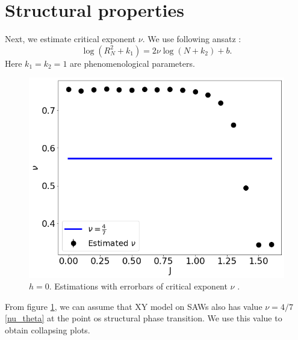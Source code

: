 \section{Structural properties}
Next, we estimate critical exponent $\nu$. We use following ansatz  \cite{Berretti1985}:
\begin{equation}
\label{berettiscale}
\log (R_N^2+k_1 ) = 2 \nu \log (N+k_2) + b.
\end{equation}
Here $k_1=k_2=1$ are phenomenological parameters. 
 \begin{figure}[H]
	\centering
	\includegraphics[scale=0.36]{Images/nu_shortchains.png}
	\caption{$h=0$. Estimations with errorbars of critical exponent $\nu$ .   }
	\label{fig:nushort}
\end{figure}
From figure \ref{fig:nushort}, we can assume that XY model on SAWs also has value $\nu = 4/7$ \eqref{nu_theta} at the point os structural phase transition. We use this value to obtain collapsing plots. 

